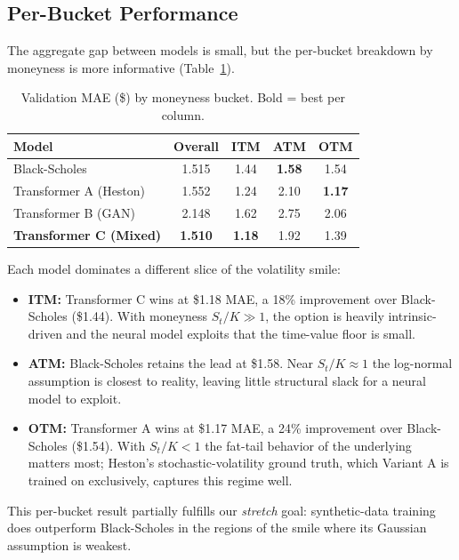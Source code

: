 \documentclass[conference]{IEEEtran}
\begin{document}
\subsection{Per-Bucket Performance}

The aggregate gap between models is small, but the per-bucket
breakdown by moneyness is more informative
(Table~\ref{tab:bucket}).

\begin{table}[t]
\caption{Validation MAE ({\rm \$}) by moneyness bucket. Bold =
best per column.}
\label{tab:bucket}
\centering
\begin{tabular}{lcccc}
\toprule
\textbf{Model} & \textbf{Overall} & \textbf{ITM} & \textbf{ATM} & \textbf{OTM} \\
\midrule
Black-Scholes               & 1.515 & 1.44 & \textbf{1.58} & 1.54 \\
Transformer A (Heston)      & 1.552 & 1.24 & 2.10 & \textbf{1.17} \\
Transformer B (GAN)         & 2.148 & 1.62 & 2.75 & 2.06 \\
\textbf{Transformer C (Mixed)} & \textbf{1.510} & \textbf{1.18} & 1.92 & 1.39 \\
\bottomrule
\end{tabular}
\end{table}

Each model dominates a different slice of the volatility smile:
\begin{itemize}
\item \textbf{ITM:} Transformer C wins at \$1.18 MAE, a 18\%
improvement over Black-Scholes (\$1.44). With moneyness
$S_t/K \gg 1$, the option is heavily intrinsic-driven and the
neural model exploits that the time-value floor is small.
\item \textbf{ATM:} Black-Scholes retains the lead at \$1.58.
Near $S_t/K \approx 1$ the log-normal assumption is closest to
reality, leaving little structural slack for a neural model
to exploit.
\item \textbf{OTM:} Transformer A wins at \$1.17 MAE, a 24\%
improvement over Black-Scholes (\$1.54). With $S_t/K < 1$ the
fat-tail behavior of the underlying matters most; Heston's
stochastic-volatility ground truth, which Variant A is trained
on exclusively, captures this regime well.
\end{itemize}

This per-bucket result partially fulfills our \emph{stretch}
goal: synthetic-data training does outperform Black-Scholes in
the regions of the smile where its Gaussian assumption is
weakest.
\end{document}

